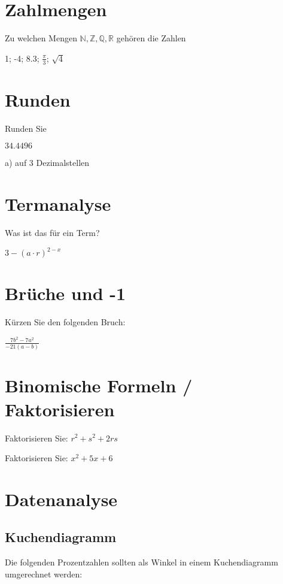 



\usepackage{amssymb} %
\renewcommand{\metaHeaderLine}{Rückblick}
\renewcommand{\arbeitsblattTitel}{1. Jahr GESO}

\arbeitsblattHeader{}

\section{Zahlmengen}
Zu welchen Mengen $\mathbb{N}, \mathbb{Z}, \mathbb{Q}, \mathbb{R}$ gehören die Zahlen

1; -4; 8.3; $\frac{\pi}{3}$; $\sqrt{4}$

\section{Runden}
Runden Sie

$34.4496$

a) auf 3 Dezimalstellen 



\section{Termanalyse}
Was ist das für ein Term?

$3 - (a\cdot{}r)^{2-x}$ 

\section{Brüche und -1}
Kürzen Sie den folgenden Bruch:

$\frac{7b^2 - 7a^2}{-21(a-b)}$

\section{Binomische Formeln / Faktorisieren}
Faktorisieren Sie:
$r^2 + s^2 + 2rs$    

Faktorisieren Sie:
$x^2 + 5x + 6$ 
\newpage


\section{Datenanalyse}
\subsection{Kuchendiagramm}
Die folgenden Prozentzahlen sollten als Winkel in einem Kuchendiagramm umgerechnet werden:

